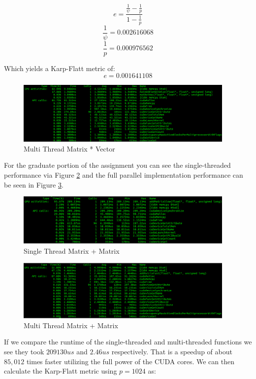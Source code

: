 \documentclass{article}
\begin{document}
$$e = \frac{\frac{1}{\psi} - \frac{1}{p}}{1 - \frac{1}{p}}$$
$$\frac{1}{\psi} = 0.002616068$$
$$\frac{1}{p} = 0.000976562$$

Which yields a Karp-Flatt metric of:
$$e = 0.001641108$$

\begin{figure}[h]
    \centering
    \includegraphics[width=0.95\textwidth]{fast}
    \caption{Multi Thread Matrix * Vector}
    \label{fig:fast}
\end{figure}

For the graduate portion of the assignment you can see the single-threaded 
performance via Figure \ref{fig:slowGrad} and the full parallel implementation 
performance can be seen in Figure \ref{fig:fastGrad}.

\begin{figure}[h]
    \centering
    \includegraphics[width=0.95\textwidth]{slowGrad}
    \caption{Single Thread Matrix + Matrix}
    \label{fig:slowGrad}
\end{figure}



\begin{figure}[h]
    \centering
    \includegraphics[width=0.95\textwidth]{fastGrad}
    \caption{Multi Thread Matrix + Matrix}
    \label{fig:fastGrad}
\end{figure}

If we compare the runtime of the single-threaded and multi-threaded functions we 
see they took $209130us$ and $2.46us$ respectively. That is a speedup of about 
$85,012$ times faster utilizing the full power of the CUDA cores. We can then 
calculate the Karp-Flatt metric using $p=1024$ as:
\end{document}
